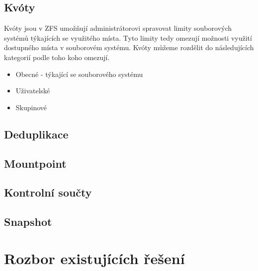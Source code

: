     \subsection{Kvóty}
    \label{quota}
    Kvóty jsou v ZFS umožňují administrátorovi spravovat limity souborových systémů týkajících se využitého místa. Tyto limity tedy omezují možnosti využití dostupného místa v souborovém systému. Kvóty můžeme rozdělit do následujících kategorií podle toho koho omezují.
    \begin{itemize}
      \item Obecné - týkající se souborového systému
      \item Uživatelské
      \item Skupinové
    \end{itemize}
    
    
    
    \subsection{Deduplikace}
    \label{dedup}
    \subsection{Mountpoint}
    \label{mount}        
    \subsection{Kontrolní součty}
    \label{checksum}
    \subsection{Snapshot}
    \label{snapshot}
\section{Rozbor existujících řešení}

